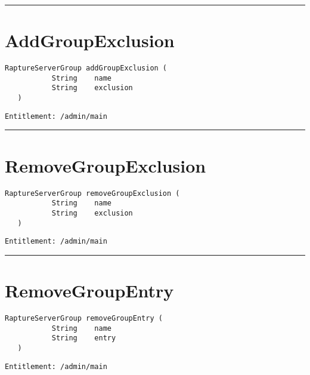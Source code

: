 \rule{12cm}{2pt}
\section{AddGroupExclusion}
\label{Api:AddGroupExclusion}
\begin{lstlisting}[style=nonumbers]
   RaptureServerGroup addGroupExclusion (
           String    name
           String    exclusion
   )
\end{lstlisting}
\begin{Verbatim}[formatcom=\color{Maroon}]
  Entitlement: /admin/main
\end{Verbatim}



\rule{12cm}{2pt}
\section{RemoveGroupExclusion}
\label{Api:RemoveGroupExclusion}
\begin{lstlisting}[style=nonumbers]
   RaptureServerGroup removeGroupExclusion (
           String    name
           String    exclusion
   )
\end{lstlisting}
\begin{Verbatim}[formatcom=\color{Maroon}]
  Entitlement: /admin/main
\end{Verbatim}



\rule{12cm}{2pt}
\section{RemoveGroupEntry}
\label{Api:RemoveGroupEntry}
\begin{lstlisting}[style=nonumbers]
   RaptureServerGroup removeGroupEntry (
           String    name
           String    entry
   )
\end{lstlisting}
\begin{Verbatim}[formatcom=\color{Maroon}]
  Entitlement: /admin/main
\end{Verbatim}



